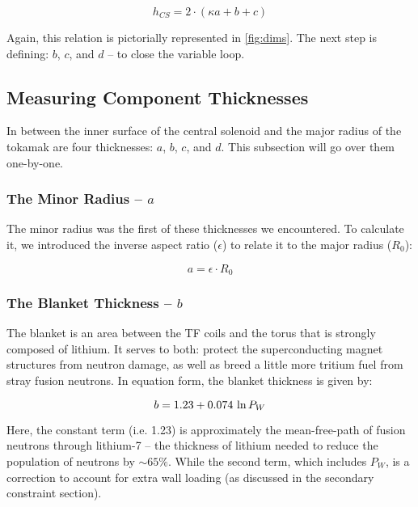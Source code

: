  \begin{equation}
	\label{eq:hcs1}
 	h_{CS} = 2 \cdot \left ( \kappa a + b + c \right)
 \end{equation}

Again, this relation is pictorially represented in \cref{fig:dims}. The next step is defining: $b$, $c$, and $d$ -- to close the variable loop.

\subsection{Measuring Component Thicknesses}
 
In between the inner surface of the central solenoid and the major radius of the tokamak are four thicknesses: $a$, $b$, $c$, and $d$. This subsection will go over them one-by-one.
 
\subsubsection{The Minor Radius -- $a$}

The minor radius was the first of these thicknesses we encountered. To calculate it, we introduced the inverse aspect ratio ($\epsilon$) to relate it to the major radius ($R_0$):

\begin{equation}
	\label{eq:aa}
	a = \epsilon \cdot R_0
\end{equation}
 
\subsubsection{The Blanket Thickness -- $b$}

The blanket is an area between the TF coils and the torus that is strongly composed of lithium. It serves to both: protect the superconducting magnet structures from neutron damage, as well as breed a little more tritium fuel from stray fusion neutrons. In equation form, the blanket thickness is given by:

\begin{equation}
	\label{eq:bb}
	b = 1.23 + 0.074 \ \textnormal{ln} \, P_W
\end{equation}

Here, the constant term (i.e. 1.23) is approximately the mean-free-path of fusion neutrons through lithium-7 -- the thickness of lithium needed to reduce the population of neutrons by $\sim 65\%$. While the second term, which includes $P_W$, is a correction to account for extra wall loading (as discussed in the secondary constraint section). 

